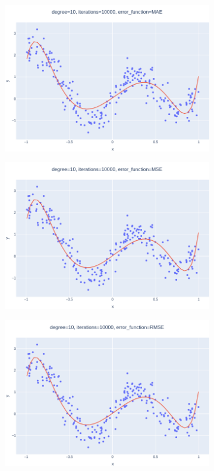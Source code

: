 \documentclass[14pt,a4]{article}
\begin{document}
\begin{figure}[h]
\begin{subfigure}{0.3\linewidth}
        \includegraphics[width=\textwidth]{images/implementation/q1/part_c/10_10000_MAE.png}
    \end{subfigure}
    \hfill
    \begin{subfigure}{0.3\textwidth}
        \centering
        \includegraphics[width=\textwidth]{images/implementation/q1/part_c/10_10000_MSE.png}
    \end{subfigure}
    \hfill
    \begin{subfigure}{0.3\linewidth}
        \centering
        \includegraphics[width=\textwidth]{images/implementation/q1/part_c/10_10000_RMSE.png}

\end{subfigure}
\end{figure}
\end{document}
